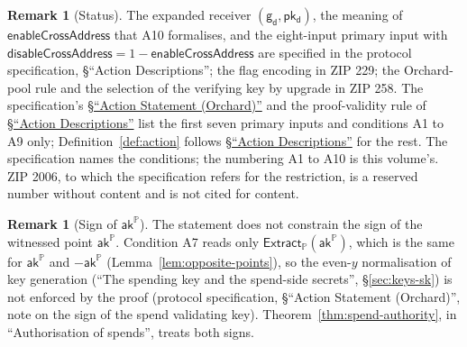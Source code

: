 \documentclass[11pt,a4paper]{article}
\theoremstyle{definition}
\newtheorem{remark}[theorem]{Remark}
\newcommand{\PP}{\mathbb{P}}
\newcommand{\Extract}{\ensuremath{\mathsf{Extract}}}
\newcommand{\aksym}{\ensuremath{\mathsf{ak}}}
\newcommand{\pkd}{\ensuremath{\mathsf{pk_d}}}
\newcommand{\gd}{\ensuremath{\mathsf{g_d}}}
\begin{document}
\begin{remark}[Status]
The expanded receiver $(\gd, \pkd)$, the meaning of
$\mathsf{enableCrossAddress}$ that A10 formalises, and the eight-input primary
input with $\mathsf{disableCrossAddress} = 1 - \mathsf{enableCrossAddress}$
are specified in the protocol specification, \S``Action Descriptions''; the
flag encoding in ZIP 229; the Orchard-pool rule and the selection of the
verifying key by upgrade in ZIP 258. The specification's
\href{https://zips.z.cash/protocol/protocol.pdf#actionstatement}%
{\S``Action Statement (Orchard)''} and the proof-validity rule of
\href{https://zips.z.cash/protocol/protocol.pdf#actiondesc}%
{\S``Action Descriptions''} list the first seven primary inputs and
conditions A1 to A9 only; Definition~\ref{def:action} follows
\href{https://zips.z.cash/protocol/protocol.pdf#actiondesc}%
{\S``Action Descriptions''} for the rest. The specification names the
conditions; the numbering A1 to A10 is this
volume's. ZIP 2006, to which the specification refers for the restriction, is
a reserved number without content and is not cited for content.
\end{remark}

\begin{remark}[Sign of $\aksym^{\PP}$]
The statement does not constrain the sign of the witnessed point
$\aksym^{\PP}$. Condition A7 reads only $\Extract_{\PP}(\aksym^{\PP})$, which
is the same for $\aksym^{\PP}$ and $-\aksym^{\PP}$
(Lemma~\ref{lem:opposite-points}), so the even-$y$ normalisation of key
generation (``The spending key and the spend-side secrets'',
\S\ref{sec:keys-sk}) is not enforced by the proof (protocol specification,
\S``Action Statement (Orchard)'', note on the sign of the spend validating
key). Theorem~\ref{thm:spend-authority}, in ``Authorisation of spends'',
treats both signs.
\end{remark}
\end{document}

